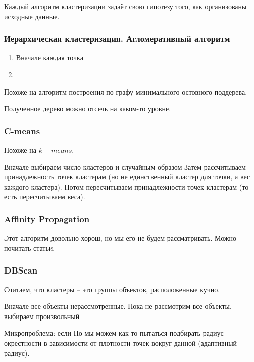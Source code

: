 \documentclass[main.tex]{subfiles}
\begin{document}
Каждый алгоритм кластеризации задаёт свою гипотезу того, как организованы исходные данные.

\subsubsection{ Иерархическая кластеризация. Агломеративный алгоритм }

\begin{enumerate}[noitemsep]
	\item Вначале каждая точка
	\item %
\end{enumerate}

Похоже на алгоритм построения по графу минимального остовного поддерева.

Полученное дерево можно отсечь на каком-то уровне.

\subsubsection{C-means}

Похоже на $k-means$.

Вначале выбираем число кластеров и случайным образом
Затем рассчитываем принадлежность точек кластерам (но не единственный кластер для точки, а вес каждого кластера).
Потом пересчитываем принадлежности точек кластерам (то есть пересчитываем веса).

\subsubsection{ Affinity Propagation }

Этот алгоритм довольно хорош, но мы его не будем рассматривать.
Можно почитать статьи.

\subsubsection{DBScan}

Считаем, что кластеры -- это группы объектов, расположенные кучно.



Вначале все объекты нерассмотренные.
Пока не рассмотрим все объекты, выбираем произвольный

Микропроблема: если
Но мы можем как-то пытаться подбирать радиус окрестности в зависимости от плотности точек вокруг данной (адаптивный радиус).

\subsubsection{} %
\end{document}
